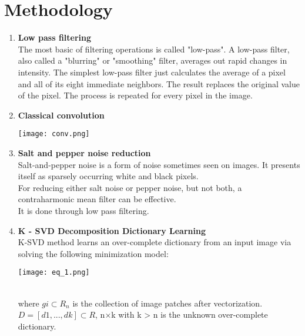 \documentclass[journal]{IEEEtran}
\begin{document}
	
	\section{\textbf{Methodology}}
	\begin{enumerate}
	    \item \textbf{Low pass filtering}\\
	    The most basic of filtering operations is called "low-pass". A low-pass filter, also called a "blurring" or "smoothing" filter, averages out rapid changes in intensity. The simplest low-pass filter just calculates the average of a pixel and all of its eight immediate neighbors. The result replaces the original value of the pixel. The process is repeated for every pixel in the image.\\
	    \item \textbf{Classical convolution}\\
        \begin{minipage}{\linewidth}
    		\centering
    		\texttt{[image: conv.png]}
    		\\
	    \end{minipage}     	    
	    \item \textbf{Salt and pepper noise reduction}\\
	    Salt-and-pepper noise is a form of noise sometimes seen on images. It presents itself as sparsely occurring white and black pixels.\\
	    For reducing either salt noise or pepper noise, but not both, a contraharmonic mean filter can be effective.\\
	    It is done through low pass filtering.
	    \item \textbf{K - SVD Decomposition Dictionary Learning}\\
	    K-SVD method learns an over-complete dictionary from an
input image via solving the following minimization model:
        \begin{minipage}{\linewidth}
    		\centering
    		\texttt{[image: eq\_1.png]}
	    \end{minipage} \\
	


 where $ gi \subset R_n$ is the collection of image patches after vectorization. $D = [d1, . . . , dk] \subset R $, n×k with k > n is the unknown over-complete dictionary.
	    
	\end{enumerate}
	
\end{document}
